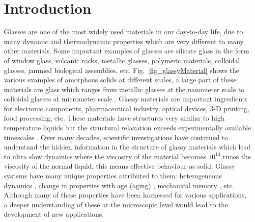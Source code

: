 \pagestyle{fancy}
\fancyhf{}
\renewcommand{\headrulewidth}{0pt}
\fancyfoot[C]{\leftmark}
\fancyhead[R]{\thepage}
\doublespacing
\chapter{Introduction}\label{chap1}

Glasses are one of the most widely used materials in our day-to-day life, due to many dynamic and thermodynamic properties which are very different to many other materials. Some important examples of glasses are silicate glass in the form of window glass, volcanic rocks, metallic glasses, polymeric materials, colloidal glasses, jammed biological assemblies, etc. Fig.~\ref{fig_glassyMaterial} shows the various examples of amorphous solids at different scales, a large part of these materials are glass which ranges from metallic glasses at the nanometer scale to colloidal glasses at micrometer scale \cite{nicolas2018deformation}.  Glassy materials are important ingredients for electronic components, pharmaceutical industry, optical devices, 3-D printing, food processing, etc. These materials have structures very similar to high temperature liquids but the structural relaxation exceeds experimentally available timescales \cite{karmakar2014growing}. Over many decades, scientific investigations \cite{angell1995formation, berthier2011theoretical, binder2011glassy, joshi2018yield,nicolas2018deformation} have continued to understand the hidden information in the structure of glassy materials which lead to ultra slow dynamics where the viscosity of the material becomes $10^{14}$ times the viscosity of the normal liquid, this means effective behaviour as solid. Glassy systems have many unique properties attributed to them: heterogeneous dynamics \cite{karmakar2014growing,garrahan2011dynamic}, change in properties with age (aging) \cite{kob2000fluctuations,abou2001aging}, mechanical memory \cite{keim2019memory,anshul17,fiocco2014encoding}, etc. Although many of these properties have been harnessed for various applications, a deeper understanding of these at the microscopic level would lead to the development of new applications.

